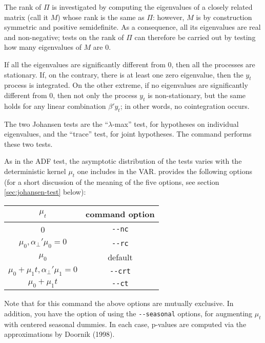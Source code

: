 The rank of $\Pi$ is investigated by computing the eigenvalues of a
closely related matrix (call it $M$) whose rank is the same as $\Pi$:
however, $M$ is by construction symmetric and positive semidefinite.
As a consequence, all its eigenvalues are real and non-negative; tests
on the rank of $\Pi$ can therefore be carried out by testing how many
eigenvalues of $M$ are 0.

If all the eigenvalues are significantly different from 0, then all the
processes are stationary. If, on the contrary, there is at least one
zero eigenvalue, then the $y_t$ process is integrated. On the other
extreme, if no eigenvalues are significantly different from 0, then not
only the process $y_t$ is non-stationary, but the same holds for any
linear combination $\beta'y_t$; in other words, no cointegration
occurs.

The two Johansen tests are the ``$\lambda$-max'' test, for hypotheses
on individual eigenvalues, and the ``trace'' test, for joint
hypotheses.  The  command  performs these two
tests.  

As in the ADF test, the asymptotic distribution of the tests varies
with the deterministic kernel $\mu_t$ one includes in the VAR.
 provides the following options (for a short discussion of
the meaning of the five options, see section \ref{sec:johansen-test} below):
\begin{center}
  \begin{tabular}{cc}
    \hline
    $\mu_t$ & command option \\
    \hline
    0 & \verb|--nc| \\
    $\mu_0, \alpha_{\perp}'\mu_0 = 0 $ &  \verb|--rc| \\
    $\mu_0$ &  default \\
    $\mu_0 + \mu_1 t , \alpha_{\perp}'\mu_1 = 0$ &  \verb|--crt| \\
    $\mu_0 + \mu_1 t$ &  \verb|--ct| \\
    \hline
  \end{tabular}
\end{center}
Note that for this command the above options are mutually exclusive.
In addition, you have the option of using the \verb|--seasonal|
options, for augmenting $\mu_t$ with centered seasonal dummies.  In
each case, p-values are computed via the approximations by Doornik
(1998).

